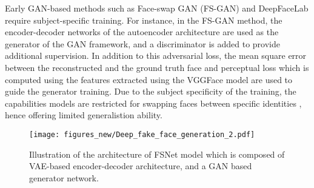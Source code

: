 Early GAN-based methods such as Face-swap GAN (FS-GAN) \cite{deepswapgan} and DeepFaceLab \cite{perov2020deepfacelab} require subject-specific training. For instance, in the FS-GAN method, the encoder-decoder networks of the autoencoder architecture are used as the generator of the GAN framework, and a discriminator is added to provide additional supervision. In addition to this adversarial loss, the mean square error between the reconstructed and the ground truth face and perceptual loss which is computed using the features extracted using the VGGFace model are used to guide the generator training. Due to the subject specificity of the training, the capabilities models are restricted for swapping faces between specific identities \cite{waseem2023deepfake}, hence offering limited generalistion ability. 

\begin{figure*}[htbp]
    \centering
    \texttt{[image: figures\_new/Deep\_fake\_face\_generation\_2.pdf]}
    \caption{Illustration of the architecture of FSNet model \cite{natsume2019fsnet} which is composed of VAE-based encoder-decoder architecture, and a GAN based generator network.}
    \label{fig:FSNet}
\end{figure*}


